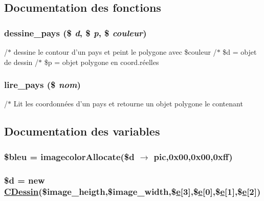 \subsection{Documentation des fonctions}
\hypertarget{allemagne_8php_a14}{
\subsubsection[dessine\_\-pays]{\setlength{\rightskip}{0pt plus 5cm}dessine\_\-pays (\$ {\em d}, \$ {\em p}, \$ {\em couleur})}}
\label{allemagne_8php_a14}


/$\ast$ dessine le contour d'un pays et peint le polygone avec \$couleur /$\ast$ \$d = objet de dessin /$\ast$ \$p = objet polygone en coord.r\'{e}elles \hypertarget{allemagne_8php_a13}{
\subsubsection[lire\_\-pays]{\setlength{\rightskip}{0pt plus 5cm}lire\_\-pays (\$ {\em nom})}}
\label{allemagne_8php_a13}


/$\ast$ Lit les coordonn\'{e}es d'un pays et retourne un objet polygone le contenant 

\subsection{Documentation des variables}
\hypertarget{allemagne_8php_a9}{
\subsubsection[\$bleu]{\setlength{\rightskip}{0pt plus 5cm}\$bleu = imagecolor\-Allocate(\$d $\rightarrow$ pic,0x00,0x00,0xff)}}
\label{allemagne_8php_a9}


\hypertarget{allemagne_8php_a6}{
\subsubsection[\$d]{\setlength{\rightskip}{0pt plus 5cm}\$d = new \hyperlink{classCDessin}{CDessin}(\$image\_\-heigth,\$image\_\-width,\$\hyperlink{apa__zone_8php_a37}{e}\mbox{[}3\mbox{]},\$\hyperlink{apa__zone_8php_a37}{e}\mbox{[}0\mbox{]},\$\hyperlink{apa__zone_8php_a37}{e}\mbox{[}1\mbox{]},\$\hyperlink{apa__zone_8php_a37}{e}\mbox{[}2\mbox{]})}}
\label{allemagne_8php_a6}


